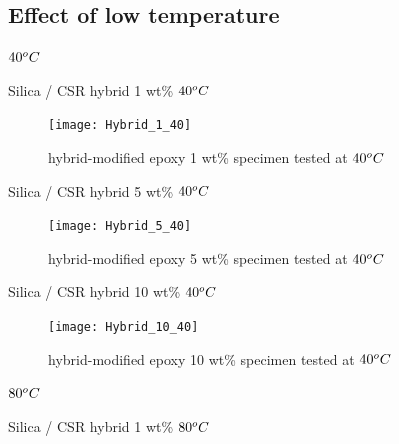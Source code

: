 \documentclass[numbers=noendperiod,chapterprefix=on]{icldt} %
\begin{document}
{\subsection{Effect of low temperature}

$\-40 ^oC$

Silica / CSR hybrid 1 wt\% $\-40 ^oC$

\begin{figure}[!htpb]
\centering
\texttt{[image: Hybrid\_1\_40]}
\caption{hybrid-modified epoxy 1 wt\% specimen tested at  $\-40 ^oC$}\label{Hybrid_1_40}
\end{figure}
\FloatBarrier

Silica / CSR hybrid 5 wt\% $\-40 ^oC$

\begin{figure}[!htpb]
\centering
\texttt{[image: Hybrid\_5\_40]}
\caption{hybrid-modified epoxy 5 wt\% specimen tested at  $\-40 ^oC$}\label{Hybrid_5_40}
\end{figure}
\FloatBarrier

Silica / CSR hybrid 10 wt\% $\-40 ^oC$

\begin{figure}[!htpb]
\centering
\texttt{[image: Hybrid\_10\_40]}
\caption{hybrid-modified epoxy 10 wt\% specimen tested at  $\-40 ^oC$}\label{Hybrid_10_40}
\end{figure}
\FloatBarrier

$\-80 ^oC$

Silica / CSR hybrid 1 wt\% $\-80 ^oC$

}
\end{document}
